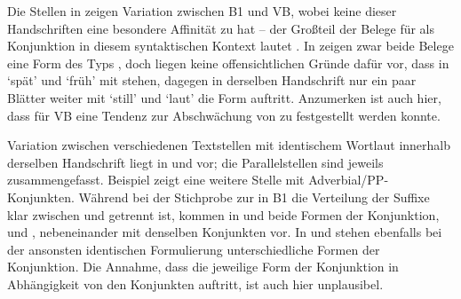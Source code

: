 Die Stellen in  zeigen Variation zwischen B1
und VB, wobei keine dieser Handschriften eine besondere Affinität zu
 hat -- der Großteil der Belege für  als
Konjunktion in diesem syntaktischen Kontext lautet . In
 zeigen zwar beide Belege eine Form des Typs
, doch liegen keine offensichtlichen Gründe dafür vor, dass in
  `spät' und  `früh'
mit  stehen, dagegen in der\-selben Handschrift nur ein paar Blätter
weiter mit  `still' und  `laut' die Form
 auftritt. Anzumerken ist auch hier, dass für VB eine
Tendenz zur Abschwächung von  zu  festgestellt werden
konnte.

Variation zwischen verschiedenen Textstellen mit identischem Wortlaut innerhalb
der\-selben Handschrift liegt in  und 
vor; die Parallelstellen sind jeweils zusammengefasst.
Beispiel  zeigt eine weitere Stelle mit
Adverbial/PP-Konjunkten. Während bei der Stichprobe zur
 in B1 die Verteilung
der Suffixe klar zwischen  und  getrennt ist, kommen in
 und  beide Formen der Konjunktion,
 und , nebeneinander mit denselben Konjunkten vor. In
 und  stehen ebenfalls bei der
ansonsten identischen Formulierung unterschiedliche Formen der Konjunktion. Die
Annahme, dass die jeweilige Form der Konjunktion in Abhängigkeit von den
Konjunkten auftritt, ist auch hier unplausibel.

